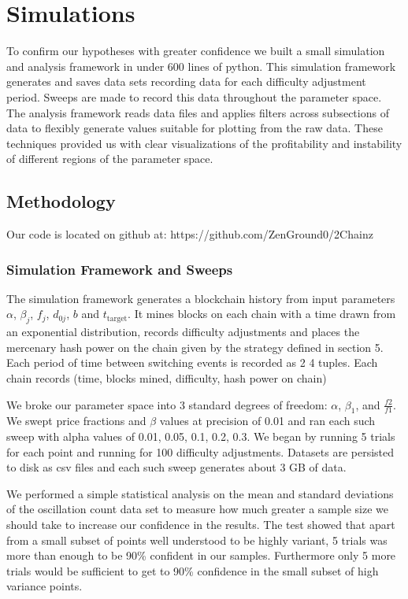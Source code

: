 \documentclass[10pt, preprint]{aastex}
\begin{document}
\section{Simulations}
To confirm our hypotheses with greater confidence we built a small simulation and analysis framework in under 600 lines of python.  This simulation framework generates and saves data sets recording data for each difficulty adjustment period.  Sweeps are made to record this data throughout the parameter space.  The analysis framework reads data files and applies filters across subsections of data to flexibly generate values suitable for plotting from the raw data.  These techniques provided us with clear visualizations of the profitability and instability of different regions of the parameter space.

\subsection{Methodology}
Our code is located on github at: https://github.com/ZenGround0/2Chainz
\subsubsection{Simulation Framework and Sweeps}
The simulation framework generates a blockchain history from input parameters $\alpha$, $\beta_j$, $f_j$, $d_{0j}$, $b$ and $t_{\text{target}}$.  It mines blocks on each chain with a time drawn from an exponential distribution, records difficulty adjustments and places the mercenary hash power on the chain given by the strategy defined in section 5.  Each period of time between switching events is recorded as 2 4 tuples.  Each chain records (time, blocks mined, difficulty, hash power on chain)

We broke our parameter space into 3 standard degrees of freedom: $\alpha$, $\beta_1$, and $\frac{f2}{f1}$.  We swept price fractions and $\beta$ values at precision of 0.01 and ran each such sweep with alpha values of 0.01, 0.05, 0.1, 0.2, 0.3.  We began by running 5 trials for each point and running for 100 difficulty adjustments.  Datasets are persisted to disk as csv files and each such sweep generates about 3 GB of data.

 We performed a simple statistical analysis on the mean and standard deviations of the oscillation count data set to measure how much greater a sample size we should take to increase our confidence in the results.  The test showed that apart from a small subset of points well understood to be highly variant, 5 trials was more than enough to be 90\% confident in our samples.  Furthermore only 5 more trials would be sufficient to get to 90\% confidence in the small subset of high variance points.
\end{document}
